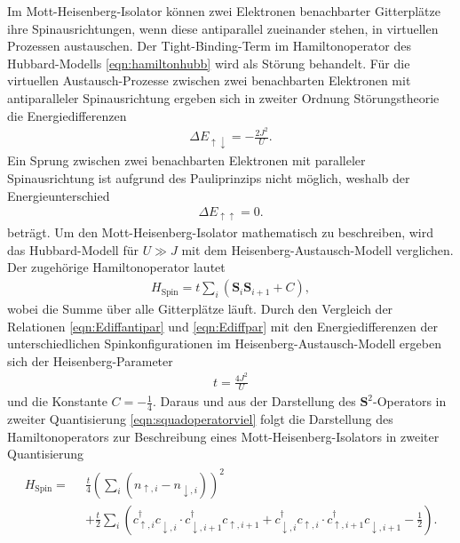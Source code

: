 Im Mott-Heisenberg-Isolator können zwei Elektronen benachbarter Gitterplätze ihre Spinausrichtungen, wenn diese antiparallel zueinander stehen, in virtuellen Prozessen austauschen.
Der Tight-Binding-Term im Hamiltonoperator des Hubbard-Modells \eqref{eqn:hamiltonhubb} wird
als Störung behandelt. Für die virtuellen Austausch-Prozesse zwischen zwei benachbarten Elektronen mit antiparalleler Spinausrichtung ergeben sich
in zweiter Ordnung Störungstheorie die Energiedifferenzen
\begin{align}
  \Delta E_{\uparrow \downarrow} = - \frac{2J^2}{U}.
  \label{eqn:Ediffantipar}
\end{align}
Ein Sprung zwischen zwei benachbarten Elektronen mit paralleler Spinausrichtung ist aufgrund des Pauliprinzips nicht möglich, weshalb der Energieunterschied
\begin{align}
  \Delta E_{\uparrow \uparrow} = 0.
  \label{eqn:Ediffpar}
\end{align}
beträgt. Um den Mott-Heisenberg-Isolator mathematisch zu beschreiben, wird das Hubbard-Modell für $U \gg J$
mit dem Heisenberg-Austausch-Modell verglichen. Der zugehörige Hamiltonoperator lautet
\begin{align}
  H_\text{Spin} = t \sum_{i} (\symbf{S}_i \symbf{S}_{i+1} + C),
  \label{eqn:hamiltonspincj}
\end{align}
wobei die Summe über alle Gitterplätze läuft. Durch den Vergleich der Relationen \eqref{eqn:Ediffantipar} und \eqref{eqn:Ediffpar}
mit den Energiedifferenzen der unterschiedlichen Spinkonfigurationen im Heisenberg-Austausch-Modell
ergeben sich der Heisenberg-Parameter
\begin{align}
  t = \frac{4 J^2}{U}
  \label{eqn:spint}
\end{align}
und die Konstante $C = -\tfrac14$.
Daraus und aus der Darstellung des $\symbf{S}^2$-Operators in zweiter Quantisierung \eqref{eqn:squadoperatorviel} folgt die Darstellung des Hamiltonoperators zur Beschreibung eines
Mott-Heisenberg-Isolators in zweiter Quantisierung
\begin{align}
  \begin{split}
    H_\text{Spin} = \, \, \, & \frac{t}{4} \left(\sum_{i} \left(n_{\uparrow,i} - n_{\downarrow,i}\right)\right)^2 \\
    & + \frac{t}{2} \sum_{i} \left( c_{\uparrow,i}^\dag c_{\downarrow,i}^{\phantom{\dag}} \cdot c_{\downarrow,i+1}^\dag c_{\uparrow,i+1}^{\phantom{\dag}} +
    c_{\downarrow,i}^\dag c_{\uparrow,i}^{\phantom{\dag}} \cdot c_{\uparrow,i+1}^\dag c_{\downarrow,i+1}^{\phantom{\dag}} - \frac12 \right).
  \end{split}
  \label{eqn:hamiltonspin2}
\end{align}
\cite{gebhard,uhrig}
